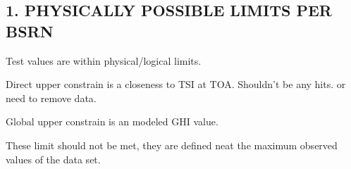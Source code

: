 \documentclass[
  10pt,
  a4paper,oneside]{article}
\newenvironment{Shaded}{\begin{snugshade}}{\end{snugshade}}
\newcommand{\CommentTok}[1]{\textcolor[rgb]{0.56,0.35,0.01}{\textit{#1}}}
\newcommand{\DecValTok}[1]{\textcolor[rgb]{0.00,0.00,0.81}{#1}}
\newcommand{\DocumentationTok}[1]{\textcolor[rgb]{0.56,0.35,0.01}{\textbf{\textit{#1}}}}
\newcommand{\FloatTok}[1]{\textcolor[rgb]{0.00,0.00,0.81}{#1}}
\newcommand{\FunctionTok}[1]{\textcolor[rgb]{0.00,0.00,0.00}{#1}}
\newcommand{\NormalTok}[1]{#1}
\newcommand{\OtherTok}[1]{\textcolor[rgb]{0.56,0.35,0.01}{#1}}
\newcommand{\SpecialCharTok}[1]{\textcolor[rgb]{0.00,0.00,0.00}{#1}}
\begin{document}
\begin{Shaded}
\end{Shaded}

\newpage

\hypertarget{physically-possible-limits-per-bsrn}{%
\subsection{1. PHYSICALLY POSSIBLE LIMITS PER BSRN}\label{physically-possible-limits-per-bsrn}}

Test values are within physical/logical limits.

Direct upper constrain is a closeness to TSI at TOA. Shouldn't be any hits.
or need to remove data.

Global upper constrain is an modeled GHI value.

These limit should not be met, they are defined neat the maximum observed
values of the data set.
\end{document}
